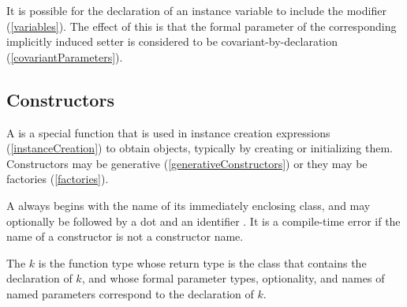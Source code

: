 \documentclass[makeidx]{article}
\begin{document}
\LMHash{}%
It is possible for the declaration of an instance variable
to include the modifier \COVARIANT{}
(\ref{variables}).
The effect of this is that the formal parameter of
the corresponding implicitly induced setter
is considered to be covariant-by-declaration
(\ref{covariantParameters}).



\subsection{Constructors}

\LMHash{}%
A  is a special function that is used
in instance creation expressions (\ref{instanceCreation}) to obtain objects,
typically by creating or initializing them.
Constructors may be generative (\ref{generativeConstructors})
or they may be factories (\ref{factories}).

\LMHash{}%
A  always begins with
the name of its immediately enclosing class,
and may optionally be followed by a dot and an identifier \id.
It is a compile-time error if the name of a constructor
is not a constructor name.

\LMHash{}%
The
$k$ is the function type
whose return type is the class that contains the declaration of $k$,
and whose formal parameter types, optionality, and names of named parameters
correspond to the declaration of $k$.


\end{document}
